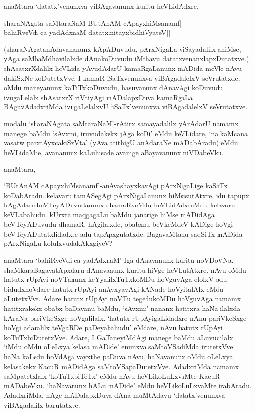 anaMtara `datatx'venunxva viBAgavanunx kuritu heVLidAdxre.

\begin{shloka}
sharaNAgata saMtaraNaM BUtAnAM cApayxhiMsanamf|\\
bahiRveVdi ca yadAdxnaM datatxmitayxbidhiVyateV||
\end{shloka}

(sharaNAgatanAdavananunx kApADuvudu, pArxNigaLa viSayadalilx ahiMse, yAga saMbaMdhavilalxde dAnakoDuvudu iMthavu datatxvenanxlapxDutatxve.) shAsatxrXdalilx heVLida yAvudAdarU kamaRgaLanunx mADida meVle nAvu dakiSxNe koDutetxVve. I kamaR iSaTxvenunxva viBAgadalelxV seVrutatxde. oMdu maneyanunx kaTiTxkoDuvudu, hasuvanunx dAnavAgi koDuvudu ivugaLelalx shAsatxrX riVtiyAgi mADalapxDuva kamaRgaLa BAgavAdadxriMda ivugaLelalxvU `iSaTx'venunxva viBAgadalelxV seVrutatxve.

modalu `sharaNAgata saMtaraNaM'-rAtirx samayadalilx yArAdarU namamx manege baMdu `sAvxmi, iruvudakekx jAga koDi' eMdu keVLidare, `na kaMcana vasatw parxtAyxcakiSxVta' (yAva atithigU anAdaraNe mADabAradu) eMdu heVLidaMte, avananunx kaLuhisade avanige aBayavanunx niVDabeVku. 

anaMtara,

`BUtAnAM cApayxhiMsanamf'-anAvashayxkavAgi pArxNigaLige kaSaTx koDabAradu. kelavaru tamASegAgi pArxNigaLanunx hiMsisutAtxre. idu tapupx. hAgAdare beVTeyADuvudanunx dhamaRveMdu heVLidAdxreMdu kelavaru keVLabahudu. kUrxra maqgagaLu baMdu janarige hiMse mADidAga beVTeyADuvudu dhamaR. hAgilalxde, obabxnu beVkeMdeV kADige hoVgi beVTeyADutatxlidadxre adu tapApxgutatxde. BagavaMtanu saqSiTx mADida pArxNigaLu kolulxvudakAkxgiyeV?

anaMtara `bahiRveVdi ca yadAdxnaM'-Iga dAnavanunx kuritu noVDoVNa. shaMkaraBagavatApxdaru dAnavanunx kuritu hiVge heVLutAtxre. nAvu oMdu hatutx rUpAyi noVTanunx keYyalilxTuTxkoMDu hoVguvAga elolxV adu bidudxhoVdare hatutx rUpAyi anAyxyavAgi kANade hoVyitalAlx eMdu aLutetxVve. Adare hatutx rUpAyi noVTu tegedukoMDu hoVguvAga namamx hatitxrakekx obabx baDavanu baMdu, `sAvxmi' nananx hatitxra haNa ilalxda kAraNa pariVkeSxge hoVgalilalx. `hatutx rUpAyigaLidadxre nAnu pariVkeSxge hoVgi adaralilx teVgaRDe paDeyabahudu' eMdare, nAvu hatutx rUpAyi koTuTxbiDutetxVve. Adare, I GaTaneyiMdAgi manege baMdu aLuvudilalx. `iMdu oMdu oLeLxya kelasa mADide' enunxva saMtoVSadiMda irutetxVve. haNa kaLedu hoVdAga vayxthe paDuva nAvu, haNavanunx oMdu oLeLxya kelasakekx KacuR mADidAga saMtoVSapaDutetxVve. AdadxriMda namamx saMpatetxlalx `koTuTxbiTeTx' eMdu nAvu heVLikoLuLxvaMte KacuR mADabeVku. `haNavanunx hALu mADide' eMdu heVLikoLuLxvaMte irabAradu. AdadxriMda, hAge mADalapxDuva dAna muMtAdavu `datatx'venunxva viBAgadalilx barutatxve.

